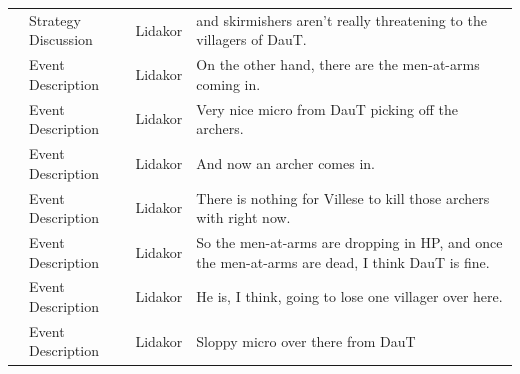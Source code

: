 {\begin{longtable}{@{}>{\theAppRow}r|L{2.3cm}L{1.0cm}U{11.55cm}@{}}
    & Strategy Discussion   & Lidakor & and skirmishers aren't really threatening to the villagers of DauT.                                                                                                                                                                                                                             \\
    & Event Description     & Lidakor & On the other hand, there are the men-at-arms coming in.                                                                                                                                                                                                                                         \\
    & Event Description     & Lidakor & Very nice micro from DauT picking off the archers.                                                                                                                                                                                                                                              \\
    & Event Description     & Lidakor & And now an archer comes in.                                                                                                                                                                                                                                                                     \\
    & Event Description     & Lidakor & There is nothing for Villese to kill those archers with right now.                                                                                                                                                                                                                              \\
    & Event Description     & Lidakor & So the men-at-arms are dropping in HP, and once the men-at-arms are dead, I think DauT is fine.                                                                                                                                                                                                 \\
    & Event Description     & Lidakor & He is, I think, going to lose one villager over here.                                                                                                                                                                                                                                           \\
    & Event Description     & Lidakor & Sloppy micro over there from DauT                                                                                                                                                                                                                                                               \\

\end{longtable}}
